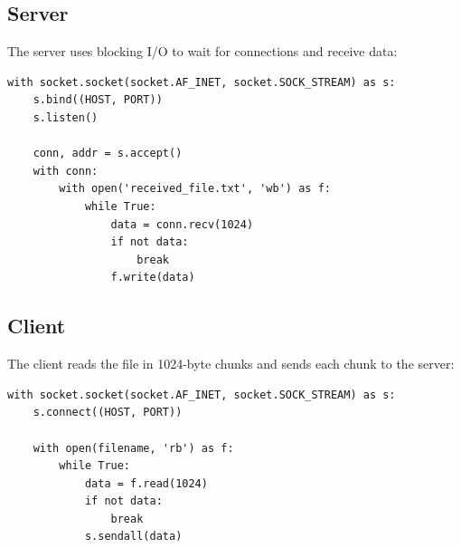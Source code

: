 \documentclass{article}
\begin{document}
\subsection{Server}
The server uses blocking I/O to wait for connections and receive data:
\begin{lstlisting}
with socket.socket(socket.AF_INET, socket.SOCK_STREAM) as s:
    s.bind((HOST, PORT))
    s.listen()
    
    conn, addr = s.accept()
    with conn:
        with open('received_file.txt', 'wb') as f:
            while True:
                data = conn.recv(1024)
                if not data:
                    break
                f.write(data)
\end{lstlisting}

\subsection{Client}
The client reads the file in 1024-byte chunks and sends each chunk to the server:
\begin{lstlisting}
with socket.socket(socket.AF_INET, socket.SOCK_STREAM) as s:
    s.connect((HOST, PORT))
    
    with open(filename, 'rb') as f:
        while True:
            data = f.read(1024)
            if not data:
                break
            s.sendall(data)
\end{lstlisting}
\end{document}
